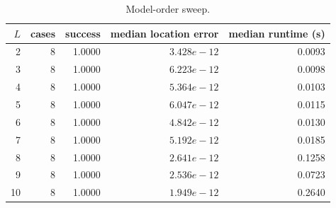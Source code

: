 \begin{table}[htbp]\centering\small
\caption{Model-order sweep.}\label{tab:order-sweep}
\begin{tabular}{rrrrr}\toprule
$L$ & cases & success & median location error & median runtime (s)\\\midrule
2 & 8 & 1.0000 & $3.428e-12$ & 0.0093\\
3 & 8 & 1.0000 & $6.223e-12$ & 0.0098\\
4 & 8 & 1.0000 & $5.364e-12$ & 0.0103\\
5 & 8 & 1.0000 & $6.047e-12$ & 0.0115\\
6 & 8 & 1.0000 & $4.842e-12$ & 0.0130\\
7 & 8 & 1.0000 & $5.192e-12$ & 0.0185\\
8 & 8 & 1.0000 & $2.641e-12$ & 0.1258\\
9 & 8 & 1.0000 & $2.536e-12$ & 0.0723\\
10 & 8 & 1.0000 & $1.949e-12$ & 0.2640\\
\bottomrule\end{tabular}\end{table}